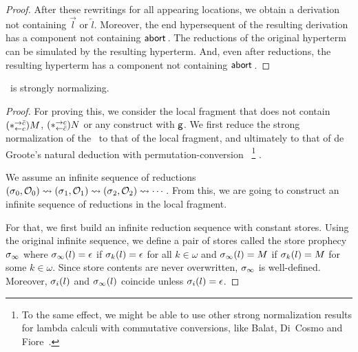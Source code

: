 {\begin{proof}
After these rewritings for all appearing locations,
we obtain a derivation not containing
$\overrightarrow{l}$ or $\overleftarrow{l}$.
Moreover, the end hypersequent of the resulting derivation has a component
not containing $\mathsf{abort\,}$.
The reductions of the original hyperterm can be simulated by the
resulting hyperterm.  And, even after reductions, the resulting
hyperterm has a component not containing $\mathsf{abort\,}$.
\end{proof}

\begin{theorem}
 \label{first:sn}
 \lgd\, is strongly normalizing.
\end{theorem}
\begin{proof}
For proving this, we consider the local fragment that does not contain
$(\ast^{\rightarrow {\bar{c}}}_{\leftarrow{c}})M$, $(\ast^{\rightarrow {c}}_{\leftarrow{\bar{c}}})N$ or any construct with $\mathsf{g}$.
We first reduce the strong
normalization of the \lgd\, to that of the local fragment, and
ultimately to that of de Groote's
natural deduction with permutation-conversion~\cite{Philippe2002js}%
\footnote{
To the
same effect, we might be able to use other strong normalization
 results for lambda calculi with commutative conversions, like Balat,
 Di~Cosmo
 and Fiore~\cite{bdf}.
}%
.

We assume an infinite sequence of reductions
$
({\sigma}{_0},{\mathcal{O}_0})
\rightsquigarrow
({\sigma}{_1},{\mathcal{O}_1})
\rightsquigarrow
({\sigma}{_2},{\mathcal{O}_2})
\rightsquigarrow\cdots
$.  From this, we are going to construct an infinite sequence of
reductions in the local fragment.

For that, we first
build an infinite reduction sequence with constant stores.
Using the original infinite sequence, we define a pair of stores called the
store prophecy ${\sigma}_\infty$ where
$ {\sigma}_\infty(l)= \epsilon$ if ${\sigma}_k(l)=\epsilon$ for all
 $k\in\omega$ and
$ {\sigma}_\infty(l)=M $ if ${\sigma}_k(l)=M$ for some $k\in\omega$.
Since store contents are never overwritten,
${\sigma}_\infty$ is well-defined.
Moreover,
${\sigma}_i(l)$ and ${\sigma}_\infty(l)$ coincide unless
${\sigma}_i(l)=\epsilon$.


\end{proof}}
